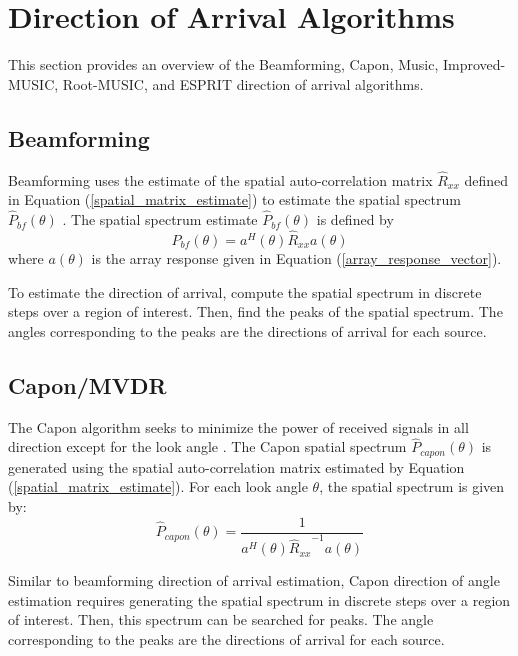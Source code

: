 \documentclass[conference]{IEEEtran}
\begin{document}
	\section{Direction of Arrival Algorithms}
	
	This section provides an overview of the Beamforming, Capon, Music, Improved-MUSIC, Root-MUSIC, and ESPRIT direction of arrival algorithms.
	
	\subsection{Beamforming}
	
		Beamforming uses the estimate of the spatial auto-correlation matrix $\hat{R}_{xx}$ defined in Equation (\ref{spatial_matrix_estimate}) to estimate the spatial spectrum $\hat{P}_{bf}(\theta)$ \cite{doa_algorithms_raghu}. The spatial spectrum estimate $\hat{P}_{bf}(\theta)$ is defined by
		\begin{equation}
			\hat{P}_{bf}(\theta) = a^H(\theta)\hat{R}_{xx}a(\theta)
		\end{equation}
		where $a(\theta)$ is the array response given in Equation (\ref{array_response_vector}).
		
		To estimate the direction of arrival, compute the spatial spectrum in discrete steps over a region of interest. Then, find the peaks of the spatial spectrum. The angles corresponding to the peaks are the directions of arrival for each source.
		
	\subsection{Capon/MVDR}
	
		The Capon algorithm seeks to minimize the power of received signals in all direction except for the look angle \cite{doa_algorithms_raghu}. The Capon spatial spectrum $\hat{P}_{capon}(\theta)$ is generated using  the spatial auto-correlation matrix estimated by Equation (\ref{spatial_matrix_estimate}). For each look angle $\theta$, the spatial spectrum is given by:
	\begin{equation}
		\hat{P}_{capon}(\theta) = \frac{1}{a^H(\theta){\hat{R}_{xx}}^{-1}a(\theta)}
	\end{equation}
	
		Similar to beamforming direction of arrival estimation, Capon direction of angle estimation requires generating the spatial spectrum in discrete steps over a region of interest. Then, this spectrum can be searched for peaks. The angle corresponding to the peaks are the directions of arrival for each source.
	
\end{document}
